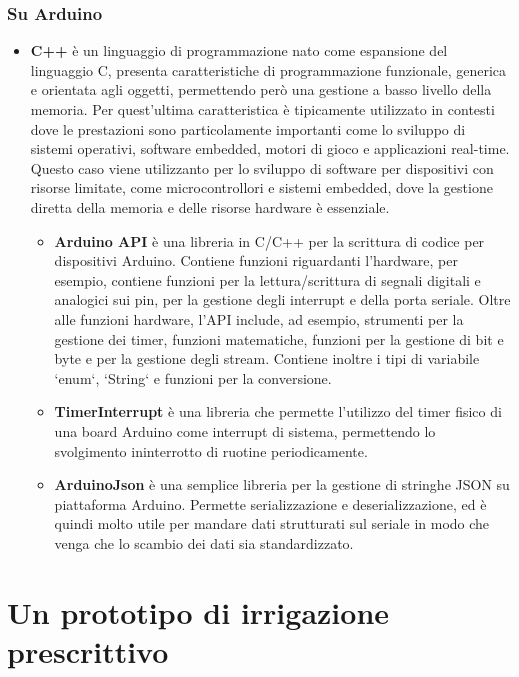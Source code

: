\documentclass[12pt,a4paper,openright,twoside, openany]{book}
\begin{document}
\subsection{Su Arduino}
\begin{itemize}
    \item \textbf{C++} è un linguaggio di programmazione nato come espansione del linguaggio C, presenta caratteristiche di programmazione funzionale, generica e orientata agli oggetti, permettendo però una gestione a basso livello della memoria. Per quest'ultima caratteristica è tipicamente utilizzato in contesti dove le prestazioni sono particolamente importanti come lo sviluppo di sistemi operativi, software embedded, motori di gioco e applicazioni real-time. Questo caso viene utilizzanto per lo sviluppo di software per dispositivi con risorse limitate, come microcontrollori e sistemi embedded, dove la gestione diretta della memoria e delle risorse hardware è essenziale.
    \begin{itemize}[noitemsep]
        \item \textbf{Arduino API} è una libreria in C/C++ per la scrittura di codice per dispositivi Arduino. Contiene funzioni riguardanti l'hardware, per esempio, contiene funzioni per la lettura/scrittura di segnali digitali e analogici sui pin, per la gestione degli interrupt e della porta seriale. Oltre alle funzioni hardware, l'API include, ad esempio, strumenti per la gestione dei timer, funzioni matematiche, funzioni per la gestione di bit e byte e per la gestione degli stream. Contiene inoltre i tipi di variabile `enum`, `String` e funzioni per la conversione.
        \item \textbf{TimerInterrupt} è una libreria che permette l'utilizzo del timer fisico di una board Arduino come interrupt di sistema, permettendo lo svolgimento ininterrotto di ruotine periodicamente.
        \item \textbf{ArduinoJson} è una semplice libreria per la gestione di stringhe JSON su piattaforma Arduino. Permette serializzazione e deserializzazione, ed è quindi molto utile per mandare dati strutturati sul seriale in modo che venga che lo scambio dei dati sia standardizzato.
    \end{itemize}
\end{itemize}

\chapter{Un prototipo di irrigazione prescrittivo}\label{capitolo-3}
\end{document}
